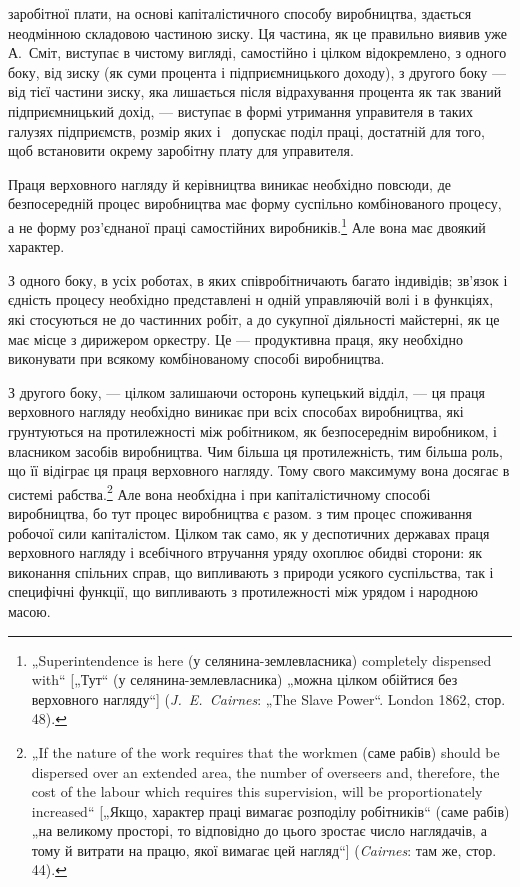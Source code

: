 \parcont{}  %
заробітної плати, на основі капіталістичного способу виробництва,
здається неодмінною складовою частиною зиску. Ця частина, як
це правильно виявив уже А.~Сміт, виступає в чистому вигляді,
самостійно і цілком відокремлено, з одного боку, від зиску (як
суми процента і підприємницького доходу), з другого боку —
від тієї частини зиску, яка лишається після відрахування процента
як так званий підприємницький дохід, — виступає в формі утримання
управителя в таких галузях підприємств, розмір яких
і~ допускає поділ праці, достатній для того, щоб встановити
окрему заробітну плату для управителя.

Праця верховного нагляду й керівництва виникає необхідно
повсюди, де безпосередній процес виробництва має форму суспільно
комбінованого процесу, а не форму роз’єднаної праці
самостійних виробників.\footnote{
„Superintendence is here (у селянина-землевласника) completely dispensed
with“ [„Тут“ (у селянина-землевласника) „можна цілком обійтися без верховного
нагляду“] (\emph{J.~E.~Cairnes}: „The Slave Power“. London 1862, стор. 48).
} Але вона має двоякий характер.

З одного боку, в усіх роботах, в яких співробітничають багато
індивідів; зв’язок і єдність процесу необхідно представлені н
одній управляючій волі і в функціях, які стосуються не до частинних
робіт, а до сукупної діяльності майстерні, як це має місце
з дирижером оркестру. Це — продуктивна праця, яку необхідно
виконувати при всякому комбінованому способі виробництва.

З другого боку, — цілком залишаючи осторонь купецький
відділ, — ця праця верховного нагляду необхідно виникає при
всіх способах виробництва, які грунтуються на протилежності
між робітником, як безпосереднім виробником, і власником засобів
виробництва. Чим більша ця протилежність, тим більша
роль, що її відіграє ця праця верховного нагляду. Тому свого
максимуму вона досягає в системі рабства.\footnote{
„If the nature of the work requires that the workmen (саме рабів) should
be dispersed over an extended area, the number of overseers and, therefore, the
cost of the labour which requires this supervision, will be proportionately increased“
[„Якщо, характер праці вимагає розподілу робітників“ (саме рабів) „на
великому просторі, то відповідно до цього зростає число наглядачів, а тому й
витрати на працю, якої вимагає цей нагляд“] (\emph{Cairnes}: там же, стор. 44).
} Але вона необхідна
і при капіталістичному способі виробництва, бо тут процес
виробництва є разом. з тим процес споживання робочої
сили капіталістом. Цілком так само, як у деспотичних державах
праця верховного нагляду і всебічного втручання уряду
охоплює обидві сторони: як виконання спільних справ, що випливають
з природи усякого суспільства, так і специфічні функції,
що випливають з протилежності між урядом і народною
масою.

